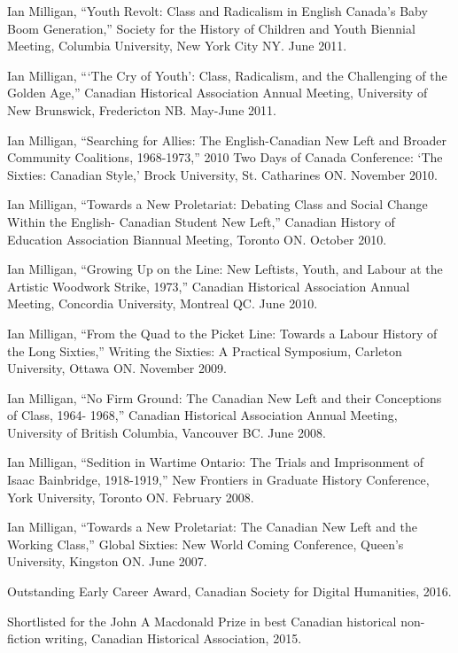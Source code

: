 \documentclass[11pt,article,oneside]{memoir}
\begin{document}
\ind Ian Milligan, ``Youth Revolt: Class and Radicalism in English Canada's Baby Boom Generation,'' Society for the History of Children and Youth Biennial Meeting, Columbia University, New York City NY. June 2011.

\ind Ian Milligan, ```The Cry of Youth': Class, Radicalism, and the Challenging of the Golden Age,'' Canadian Historical Association Annual Meeting, University of New Brunswick, Fredericton NB. May-June 2011.

\ind Ian Milligan, ``Searching for Allies: The English-Canadian New Left and Broader Community Coalitions, 1968-1973,'' 2010 Two Days of Canada Conference: `The Sixties: Canadian Style,' Brock University, St. Catharines ON. November 2010.

\ind Ian Milligan, ``Towards a New Proletariat: Debating Class and Social Change Within the English- Canadian Student New Left,'' Canadian History of Education Association Biannual Meeting, Toronto ON. October 2010.

\ind Ian Milligan, ``Growing Up on the Line: New Leftists, Youth, and Labour at the Artistic Woodwork Strike, 1973,'' Canadian Historical Association Annual Meeting, Concordia University, Montreal QC. June 2010.

\ind Ian Milligan, ``From the Quad to the Picket Line: Towards a Labour History of the Long Sixties,'' Writing the Sixties: A Practical Symposium, Carleton University, Ottawa ON. November 2009.

\ind Ian Milligan, ``No Firm Ground: The Canadian New Left and their Conceptions of Class, 1964- 1968,'' Canadian Historical Association Annual Meeting, University of British Columbia, Vancouver BC. June 2008.

\ind Ian Milligan, ``Sedition in Wartime Ontario: The Trials and Imprisonment of Isaac Bainbridge, 1918-1919,'' New Frontiers in Graduate History Conference, York University, Toronto ON. February 2008.

\ind Ian Milligan, ``Towards a New Proletariat: The Canadian New Left and the Working Class,'' Global Sixties: New World Coming Conference, Queen's University, Kingston ON. June 2007.

\bigskip 

\medskip

\ind Outstanding Early Career Award, Canadian Society for Digital Humanities, 2016.

\ind Shortlisted for the John A Macdonald Prize in best Canadian historical non-fiction writing, Canadian Historical Association, 2015.
\end{document}
